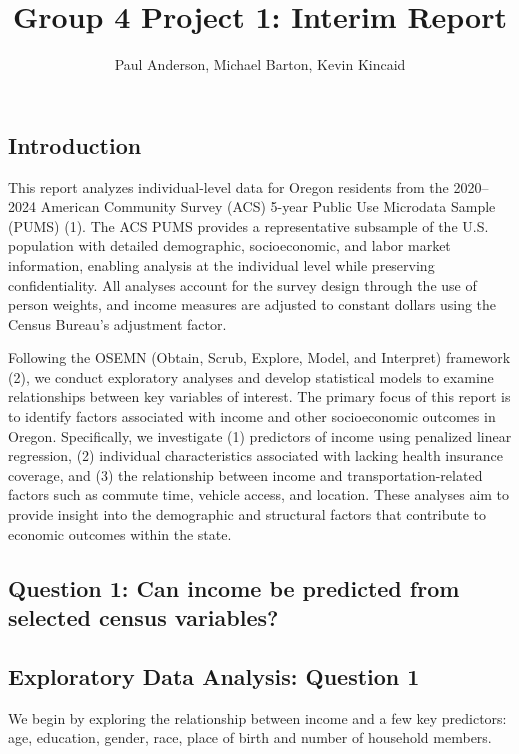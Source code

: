 \documentclass[
  letterpaper,
  DIV=11,
  numbers=noendperiod]{scrartcl}
\title{Group 4 Project 1: Interim Report}
\author{Paul Anderson, Michael Barton, Kevin Kincaid}
\date{}
\begin{document}
\maketitle


\subsection{Introduction}\label{introduction}

This report analyzes individual-level data for Oregon residents from the
2020--2024 American Community Survey (ACS) 5-year Public Use Microdata
Sample (PUMS) (1). The ACS PUMS provides a representative subsample of
the U.S. population with detailed demographic, socioeconomic, and labor
market information, enabling analysis at the individual level while
preserving confidentiality. All analyses account for the survey design
through the use of person weights, and income measures are adjusted to
constant dollars using the Census Bureau's adjustment factor.

Following the OSEMN (Obtain, Scrub, Explore, Model, and Interpret)
framework (2), we conduct exploratory analyses and develop statistical
models to examine relationships between key variables of interest. The
primary focus of this report is to identify factors associated with
income and other socioeconomic outcomes in Oregon. Specifically, we
investigate (1) predictors of income using penalized linear regression,
(2) individual characteristics associated with lacking health insurance
coverage, and (3) the relationship between income and
transportation-related factors such as commute time, vehicle access, and
location. These analyses aim to provide insight into the demographic and
structural factors that contribute to economic outcomes within the
state.

\subsection{Question 1: Can income be predicted from selected census
variables?}\label{question-1-can-income-be-predicted-from-selected-census-variables}

\subsection{Exploratory Data Analysis: Question
1}\label{exploratory-data-analysis-question-1}

We begin by exploring the relationship between income and a few key
predictors: age, education, gender, race, place of birth and number of
household members.
\end{document}
